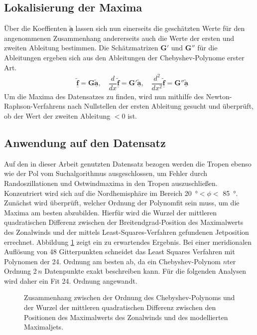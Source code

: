 \subsection{Lokalisierung der Maxima}
Über die Koeffienten $\underline{\boldsymbol{\tilde{a}}}$ lassen sich nun einerseits die geschätzten Werte für den angenommenen Zusammenhang andererseits auch die Werte der ersten und zweiten Ableitung bestimmen. Die Schätzmatrizen $\boldsymbol{G}'$ und $\boldsymbol{G}''$ für die Ableitungen ergeben sich aus den Ableitungen der Chebyshev-Polynome erster Art.
\begin{align}
& \underline{\boldsymbol{\tilde{f}}} = \boldsymbol{G}\underline{\boldsymbol{\tilde{a}}}, \hspace{1em} \dfrac{d}{dx}\underline{\boldsymbol{\tilde{f}}} = \boldsymbol{G}'\underline{\boldsymbol{\tilde{a}}}, \hspace{1em} \dfrac{d^2}{dx^2}\underline{\boldsymbol{\tilde{f}}} = \boldsymbol{G}''\underline{\boldsymbol{\tilde{a}}}
\end{align}
Um die Maxima des Datensatzes zu finden, wird nun mithilfe des Newton-Raphson-Verfahrens nach Nullstellen der ersten Ableitung gesucht und überprüft, ob der Wert der zweiten Ableitung $<$\num{0} ist.


\subsection{Anwendung auf den Datensatz}
Auf den in dieser Arbeit genutzten Datensatz bezogen werden die Tropen ebenso wie der Pol vom Suchalgorithmus ausgeschlossen, um Fehler durch Randoszillationen und Ostwindmaxima in den Tropen auszuschließen. Konzentriert wird sich auf die Nordhemisphäre im Bereich \SI{20}{\degree}$<\phi<$ \SI{85}{\degree}. Zunächst wird überprüft, welcher Ordnung der Polynomfit sein muss, um die Maxima am besten abzubilden. Hierfür wird die Wurzel der mittleren quadratischen Differenz zwischen der Breitendgrad-Position des Maximalwerts des Zonalwinds und der mittels Least-Squares-Ver\-fah\-ren gefundenen Jetposition errechnet. Abbildung \ref{fig:order_rmse} zeigt ein zu erwartendes Ergebnis. Bei einer meridionalen Auflösung von \num{48} Gitterpunkten schneidet das Least Squares Verfahren mit Polynomen der 24. Ordnung am besten ab, da ein Chebyshev-Polynom $n$ter Ordnung \num{2}\,$n$ Datenpunkte exakt beschreiben kann. Für die folgenden Analysen wird daher ein Fit 24. Ordnung angewandt. 

\begin{figure}
  \centering
  \caption[Optimierung der Ordnung des Chebyshev-Polynomfits]{Zusammenhang zwischen der Ordnung des Chebyshev-Polynoms und der Wurzel der mittleren quadratischen Differenz zwischen den Positionen des Maximalwerts des Zonalwinds und des modellierten Maximaljets.} \label{fig:order_rmse}
\end{figure}

